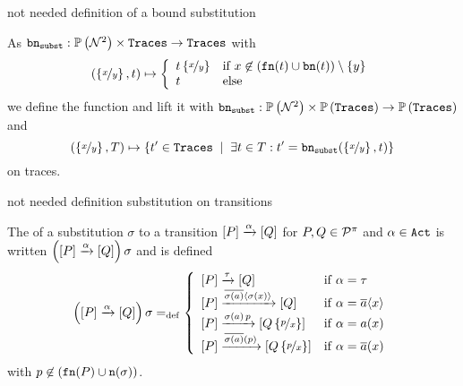 \begin{old}{not needed definition of a bound substitution}
\begin{definition}
\label{def_bound_substitution}
As $\mathtt{bn}_{\mathtt{subst}}{}:\mathbb P\left(\mathcal N^2\right)\times\mathtt{Traces}\rightarrow\mathtt{Traces}$ with
\begin{align*}
\left(\subs{x}{y},t\right)\mapsto\left\{ \begin{array}{ll}
					t\subs{x}{y} & \text{if } x\nin\left(\fn{t}\cup\bn{t}\right)\setminus\set{y} \\
					t 		& \text{else}
				\end{array}\right.
\end{align*}
we define the  function and lift it with $\mathtt{bn}_{\mathtt{subst}}{}:\mathbb P\left(\mathcal N^2\right)\times\mathbb P\left(\mathtt{Traces}\right)\rightarrow\mathbb P\left(\mathtt{Traces}\right)$ and
\[ \left(\subs{x}{y}, T\right)\mapsto \set[\exists{}t\in{}T: t'=\bnsubst{x}{y}{t}]{t'\in\tr}\]
on traces.
\end{definition}
\end{old}
\begin{old}{not needed definition substitution on transitions}
\begin{definition}
\label{def_substitution_transitions}
The  of a substitution $\sigma$ to a transition $\left[P\right]\xrightarrow{\alpha}\left[Q\right]$ for $P,Q\in\mathcal P^{\pi}$ and $\alpha\in\mathtt{Act}$ is written $\left(\left[P\right]\xrightarrow{\alpha}\left[Q\right]\right)\sigma$ and is defined
	\begin{align*}
		\left(\left[P\right]\xrightarrow{\alpha}\left[Q\right]\right)\sigma=_{\mathrm{def}}
					\left\{\begin{array}{ll}
							\left[P\right]\xrightarrow{\tau}\left[Q\right] & \mathrm{if}\;\alpha=\tau\\
							\left[P\right]\xrightarrow{\overline{\sigma(a)}\langle\sigma(x)\rangle}\left[Q\right] & \mathrm{if}\;\alpha=\overline{a}\langle x\rangle\\
							\left[P\right]\xrightarrow{\sigma(a)\,p}\left[Q\left\{\nicefrac{p}{x}\right\}\right]& \mathrm{if}\;\alpha=a(x)\\
							\left[P\right]\xrightarrow{\overline{\sigma(a)}(p)}\left[Q\left\{\nicefrac{p}{x}\right\}\right]& \mathrm{if}\;\alpha=\overline{a}(x)
						\end{array}
		\right.
	\end{align*}
with $p\not\in\left(\mathtt{fn}(P)\cup\mathtt{n}(\sigma)\right)$.
\end{definition}
\end{old}

